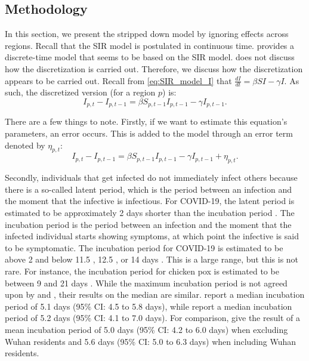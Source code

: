 \documentclass[12pt]{article}
\begin{document}
	\subsection{Methodology} \label{subsec:model_within_methodology}
	In this section, we present the stripped down model by \textcite{adda2016economic} ignoring effects across regions. Recall that the SIR model is postulated in continuous time. \textcite{adda2016economic} provides a discrete-time model that seems to be based on the SIR model. \textcite{adda2016economic} does not discuss how the discretization is carried out. Therefore, we discuss how the discretization appears to be carried out. Recall from \eqref{eq:SIR_model_I} that $\frac{dI}{dt} = \beta SI - \gamma I$. As such, the discretized version (for a region $p$) is:
	    \begin{equation}\label{eq:discretized_sir}
	        I_{p,t} - I_{p,t-1} = \beta S_{p,t-1}I_{p,t-1} - \gamma I_{p,t-1}.
	    \end{equation}
	   
	There are a few things to note. Firstly, if we want to estimate this equation's parameters, an error occurs. This is added to the model through an error term denoted by $\eta_{p,t}$:
	    \begin{equation}\label{eq:discretized_sir_error}
	        I_{p,t} - I_{p,t-1} = \beta S_{p,t-1}I_{p,t-1} - \gamma I_{p,t-1} + \eta_{p,t}.
	    \end{equation}
	
	Secondly, individuals that get infected do not immediately infect others because there is a so-called latent period, which is the period between an infection and the moment that the infective is infectious. For COVID-19, the latent period is estimated to be approximately 2 days shorter than the incubation period \parencite{he2020temporal}. The incubation period is the period between an infection and the moment that the infected individual starts showing symptoms, at which point the infective is said to be symptomatic. The incubation period for COVID-19 is estimated to be above 2 and below 11.5 \parencite{lauer2020incubation}, 12.5 \parencite{li2020incubation}, or 14 days \parencite{linton2020incubation}. This is a large range, but this is not rare. For instance, the incubation period for chicken pox is estimated to be between 9 and 21 days \parencite{papadopoulos2018chickenpox}. While the maximum incubation period is not agreed upon by \textcite{lauer2020incubation} and \textcite{li2020incubation}, their results on the median are similar. \textcite{lauer2020incubation} report a median incubation period of 5.1 days (95\% CI: 4.5 to 5.8 days), while \textcite{li2020incubation} report a median incubation period of 5.2 days (95\% CI: 4.1 to 7.0 days). For comparison, \textcite{linton2020incubation} give the result of a mean incubation period of 5.0 days (95\% CI: 4.2 to 6.0 days) when excluding Wuhan residents and 5.6 days (95\% CI: 5.0 to 6.3 days) when including Wuhan residents. \\
	
\end{document}
